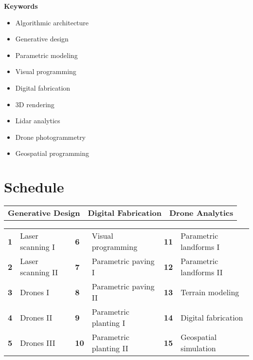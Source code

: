 \documentclass[11pt,article,oneside]{memoir}
\begin{document}
\noindent\textbf{Keywords}
\begin{multicols}{3}
\raggedright
\small
\begin{itemize}
\item Algorithmic architecture
\item Generative design
\item Parametric modeling
\item Visual programming
\item Digital fabrication
\item 3D rendering
\item Lidar analytics
\item Drone photogrammetry
\item Geospatial programming
\end{itemize}
\end{multicols}

\section{Schedule}

\begin{table}[H]
\begin{tabular}{l @{\hskip 0.75cm} l @{\hskip 1.9cm} l}
\textbf{Generative Design} & \textbf{Digital Fabrication} & \textbf{Drone Analytics}\\
\end{tabular}
\end{table}
%
\vspace*{-1em}
%
\begin{table}[H]
\small
\begin{tabular}{l l l l l l}
\small
\textbf{1} & Laser scanning  I  & \textbf{6} & Visual programming & \textbf{11} & Parametric landforms I\\
\textbf{2} & Laser scanning  II & \textbf{7} & Parametric paving I & \textbf{12} & Parametric landforms II\\
\textbf{3} & Drones I & \textbf{8} & Parametric paving II & \textbf{13} & Terrain modeling\\
\textbf{4} & Drones II  & \textbf{9} & Parametric planting I & \textbf{14} & Digital fabrication\\
\textbf{5} & Drones III & \textbf{10} & Parametric planting II & \textbf{15} & Geospatial simulation\\

\end{tabular}
\end{table}
\end{document}
